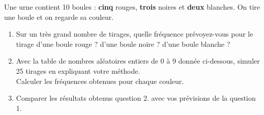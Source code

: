 \begin{exo}\label{fluctuex3}
Une urne contient 10 boules : \textbf{cinq} rouges, \textbf{trois} noires et \textbf{deux} blanches. On tire une boule et on regarde sa couleur.
\begin{enumerate}
	\item Sur un tr\`es grand nombre de tirages, quelle fr\'equence pr\'evoyez-vous pour le tirage d'une boule rouge ? d'une boule noire ? d'une boule blanche ?
	\item Avec la table de nombres al\'eatoires entiers de 0 \`a 9 donn\'ee ci-dessous, simuler 25 tirages en expliquant votre m\'ethode. \\
	Calculer les fr\'equences obtenues pour chaque couleur.
	\item Comparer les r\'esultats obtenus question 2. avec vos pr\'evisions de la question 1.
\end{enumerate}
\reinitrand[first=0, last=9] %
\begin{center}
\rand{} \quad \rand{} \quad \rand{} \quad \rand{} \quad \rand{} \quad \rand{} \quad \rand{} \quad \rand{} \quad \rand{} \quad \rand{} \quad \rand{} \quad \rand{} \quad \rand{} \quad \rand{} \quad \rand{} \quad \rand{} \quad \rand{} \quad \rand{} \quad \rand{} \quad \rand{}

\rand{} \quad \rand{} \quad \rand{} \quad \rand{} \quad \rand{} \quad \rand{} \quad \rand{} \quad \rand{} \quad \rand{} \quad \rand{} \quad \rand{} \quad \rand{} \quad \rand{} \quad \rand{} \quad \rand{} \quad \rand{} \quad \rand{} \quad \rand{} \quad \rand{} \quad \rand{}

\rand{} \quad \rand{} \quad \rand{} \quad \rand{} \quad \rand{} \quad \rand{} \quad \rand{} \quad \rand{} \quad \rand{} \quad \rand{} \quad \rand{} \quad \rand{} \quad \rand{} \quad \rand{} \quad \rand{} \quad \rand{} \quad \rand{} \quad \rand{} \quad \rand{} \quad \rand{}


\end{center}
\end{exo}
